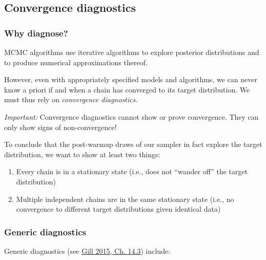 \documentclass[
  11pt,
]{article}
\providecommand{\tightlist}{%
  \setlength{\itemsep}{0pt}\setlength{\parskip}{0pt}}
\begin{document}
\hypertarget{convergence-diagnostics}{%
\subsection{Convergence diagnostics}\label{convergence-diagnostics}}

\hypertarget{why-diagnose}{%
\subsubsection{Why diagnose?}\label{why-diagnose}}

MCMC algorithms use iterative algorithms to explore posterior distributions and to produce numerical approximations thereof.

However, even with appropriately specified models and algorithms, we can never know a priori if and when a chain has converged to its target distribution. We must thus rely on \emph{convergence diagnostics}.

\emph{Important:} Convergence diagnostics cannot show or prove convergence. They can only show signs of non-convergence!

To conclude that the post-warmup draws of our sampler in fact explore the target distribution, we want to show at least two things:

\begin{enumerate}
\def\labelenumi{\arabic{enumi}.}
\tightlist
\item
  Every chain is in a stationary state (i.e., does not ``wander off'' the target distribution)
\item
  Multiple independent chains are in the same stationary state (i.e., no convergence to different target distributions given identical data)
\end{enumerate}

\hypertarget{generic-diagnostics}{%
\subsubsection{Generic diagnostics}\label{generic-diagnostics}}

Generic diagnostics (see \href{https://www.routledge.com/Bayesian-Methods-A-Social-and-Behavioral-Sciences-Approach-Third-Edition/Gill/p/book/9781439862483}{Gill 2015, Ch. 14.3}) include:
\end{document}
